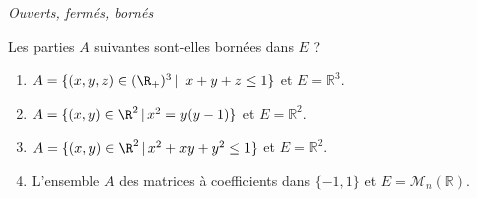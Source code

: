 \documentclass[a4paper,10pt]{report}
\begin{document}
\medskip

\begin{center}
\textit{{ {\large Ouverts, fermés, bornés}}}
\end{center}

\medskip



\begin{Exa} Les parties $A$ suivantes sont-elles bornées dans $E$ ?

\begin{enumerate}
\item $A= \lbrace (x,y,z)\in (\R_+)^3 \, \vert \,  \ x+y+z\leq 1\rbrace$ et $E= \mathbb{R}^3$.
\item $A = \lbrace (x,y)\in\R^2 \, \vert \, x^2=y(y-1) \rbrace$ et $E= \mathbb{R}^2$.
\item $A = \lbrace (x,y)\in\R^2 \, \vert \, x^2+xy+y^2\leq1 \rbrace$ et $E= \mathbb{R}^2$.
\item L'ensemble $A$ des matrices à coefficients dans $\lbrace -1,1 \rbrace$ et $E = \mathcal{M}_n(\mathbb{R})$.
\end{enumerate}
\end{Exa}
\end{document}
